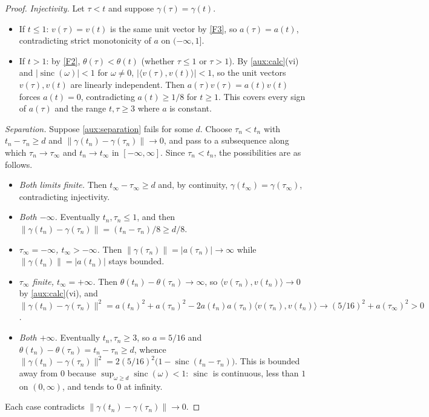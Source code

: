\documentclass[11pt]{article}
\newcommand{\norm}[1]{\lVert #1\rVert}
\newcommand{\ip}[2]{\langle #1,#2\rangle}
\DeclareMathOperator{\sinc}{sinc}
\theoremstyle{definition}
\numberwithin{equation}{section}
\begin{document}
\begin{proof}
\emph{Injectivity.} Let \(\tau<t\) and suppose \(\gamma(\tau)=\gamma(t)\).
\begin{itemize}
\item If \(t\le1\): \(v(\tau)=v(t)\) is the same unit vector by \ref{F3}, so
\(a(\tau)=a(t)\), contradicting strict monotonicity of \(a\) on
\((-\infty,1]\).
\item If \(t>1\): by \ref{F2}, \(\theta(\tau)<\theta(t)\) (whether
\(\tau\le1\) or \(\tau>1\)). By \cref{aux:calc}(vi) and
\(|\sinc(\omega)|<1\) for \(\omega\ne0\),
\(|\ip{v(\tau)}{v(t)}|<1\), so the unit vectors \(v(\tau),v(t)\) are linearly
independent. Then \(a(\tau)v(\tau)=a(t)v(t)\) forces \(a(t)=0\),
contradicting \(a(t)\ge1/8\) for \(t\ge1\). This covers every sign of
\(a(\tau)\) and the range \(t,\tau\ge3\) where \(a\) is constant.
\end{itemize}

\emph{Separation.} Suppose \eqref{aux:separation} fails for some \(d\). Choose
\(\tau_n<t_n\) with \(t_n-\tau_n\ge d\) and
\(\norm{\gamma(t_n)-\gamma(\tau_n)}\to0\), and pass to a subsequence along
which \(\tau_n\to\tau_\infty\) and \(t_n\to t_\infty\) in \([-\infty,\infty]\).
Since \(\tau_n<t_n\), the possibilities are as follows.
\begin{itemize}
\item \emph{Both limits finite.} Then \(t_\infty-\tau_\infty\ge d\) and, by
continuity, \(\gamma(t_\infty)=\gamma(\tau_\infty)\), contradicting
injectivity.
\item \emph{Both \(-\infty\).} Eventually \(t_n,\tau_n\le1\), and then
\(\norm{\gamma(t_n)-\gamma(\tau_n)}=(t_n-\tau_n)/8\ge d/8\).
\item \emph{\(\tau_\infty=-\infty\), \(t_\infty>-\infty\).} Then
\(\norm{\gamma(\tau_n)}=|a(\tau_n)|\to\infty\) while
\(\norm{\gamma(t_n)}=|a(t_n)|\) stays bounded.
\item \emph{\(\tau_\infty\) finite, \(t_\infty=+\infty\).} Then
\(\theta(t_n)-\theta(\tau_n)\to\infty\), so
\(\ip{v(\tau_n)}{v(t_n)}\to0\) by \cref{aux:calc}(vi), and
\(\norm{\gamma(t_n)-\gamma(\tau_n)}^2
=a(t_n)^2+a(\tau_n)^2-2a(t_n)a(\tau_n)\ip{v(\tau_n)}{v(t_n)}
\to(5/16)^2+a(\tau_\infty)^2>0\).
\item \emph{Both \(+\infty\).} Eventually \(t_n,\tau_n\ge3\), so
\(a=5/16\) and \(\theta(t_n)-\theta(\tau_n)=t_n-\tau_n\ge d\), whence
\(\norm{\gamma(t_n)-\gamma(\tau_n)}^2
=2(5/16)^2\bigl(1-\sinc(t_n-\tau_n)\bigr)\). This is bounded away from \(0\)
because \(\sup_{\omega\ge d}\sinc(\omega)<1\): \(\sinc\) is continuous, less
than \(1\) on \((0,\infty)\), and tends to \(0\) at infinity.
\end{itemize}
Each case contradicts \(\norm{\gamma(t_n)-\gamma(\tau_n)}\to0\).
\end{proof}
\end{document}
